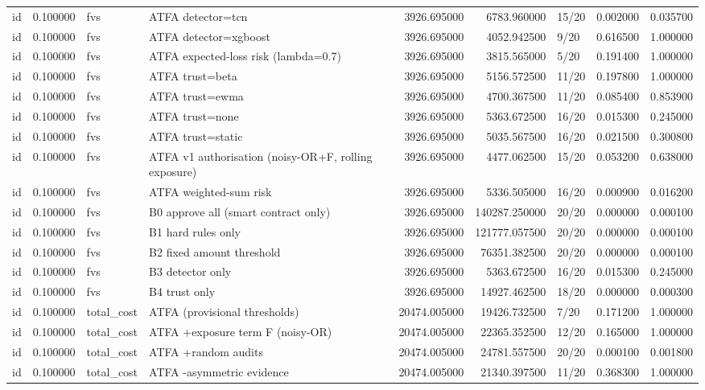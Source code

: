 \begin{tabular}{lrllrrlrr}
id & 0.100000 & fvs & ATFA detector=tcn & 3926.695000 & 6783.960000 & 15/20 & 0.002000 & 0.035700 \\
id & 0.100000 & fvs & ATFA detector=xgboost & 3926.695000 & 4052.942500 & 9/20 & 0.616500 & 1.000000 \\
id & 0.100000 & fvs & ATFA expected-loss risk (lambda=0.7) & 3926.695000 & 3815.565000 & 5/20 & 0.191400 & 1.000000 \\
id & 0.100000 & fvs & ATFA trust=beta & 3926.695000 & 5156.572500 & 11/20 & 0.197800 & 1.000000 \\
id & 0.100000 & fvs & ATFA trust=ewma & 3926.695000 & 4700.367500 & 11/20 & 0.085400 & 0.853900 \\
id & 0.100000 & fvs & ATFA trust=none & 3926.695000 & 5363.672500 & 16/20 & 0.015300 & 0.245000 \\
id & 0.100000 & fvs & ATFA trust=static & 3926.695000 & 5035.567500 & 16/20 & 0.021500 & 0.300800 \\
id & 0.100000 & fvs & ATFA v1 authorisation (noisy-OR+F, rolling exposure) & 3926.695000 & 4477.062500 & 15/20 & 0.053200 & 0.638000 \\
id & 0.100000 & fvs & ATFA weighted-sum risk & 3926.695000 & 5336.505000 & 16/20 & 0.000900 & 0.016200 \\
id & 0.100000 & fvs & B0 approve all (smart contract only) & 3926.695000 & 140287.250000 & 20/20 & 0.000000 & 0.000100 \\
id & 0.100000 & fvs & B1 hard rules only & 3926.695000 & 121777.057500 & 20/20 & 0.000000 & 0.000100 \\
id & 0.100000 & fvs & B2 fixed amount threshold & 3926.695000 & 76351.382500 & 20/20 & 0.000000 & 0.000100 \\
id & 0.100000 & fvs & B3 detector only & 3926.695000 & 5363.672500 & 16/20 & 0.015300 & 0.245000 \\
id & 0.100000 & fvs & B4 trust only & 3926.695000 & 14927.462500 & 18/20 & 0.000000 & 0.000300 \\
id & 0.100000 & total\_cost & ATFA (provisional thresholds) & 20474.005000 & 19426.732500 & 7/20 & 0.171200 & 1.000000 \\
id & 0.100000 & total\_cost & ATFA +exposure term F (noisy-OR) & 20474.005000 & 22365.352500 & 12/20 & 0.165000 & 1.000000 \\
id & 0.100000 & total\_cost & ATFA +random audits & 20474.005000 & 24781.557500 & 20/20 & 0.000100 & 0.001800 \\
id & 0.100000 & total\_cost & ATFA -asymmetric evidence & 20474.005000 & 21340.397500 & 11/20 & 0.368300 & 1.000000 \\

\end{tabular}

